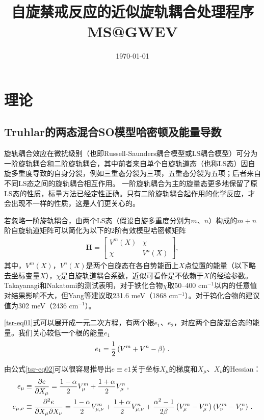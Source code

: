 \documentclass[UTF8]{ctexart}
\title{\heiti 自旋禁戒反应的近似旋轨耦合处理程序MS@GWEV}
\date{\today}
\begin{document}
\maketitle

\vspace{10mm}
\tableofcontents

\newpage

\section{理论}

\subsection{Truhlar的两态混合SO模型哈密顿及能量导数}

旋轨耦合效应在微扰级别（也即Russell-Saunders耦合模型或LS耦合模型\cite{ref1}）可分为一阶旋轨耦合和二阶旋轨耦合，其中前者来自单个自旋轨道态（也称LS态）因自旋多重度导致的自身分裂，例如三重态分裂为三项，五重态分裂为五项；后者来自不同LS态之间的旋轨耦合相互作用。
一阶旋轨耦合为主的旋量态更多地保留了原LS态的性质，标量方法已经定性正确。只有二阶旋轨耦合起作用的化学反应，才会出现不一样的性质，这是人们更关心的。

若忽略一阶旋轨耦合，由两个LS态（假设自旋多重度分别为$m$、$n$）构成的$m+n$阶自旋轨道矩阵可以简化为以下的2阶有效模型哈密顿矩阵\cite{ref2,ref3}
\begin{align}\label{tsr-eq01}
\mathbf{H} =
\left[\begin{array}{cc}
    V^m(X) &  \chi \\
    \chi & V^n(X)
\end{array}\right],
\end{align}
其中，$V^m(X)$，$V^n(X)$是两个自旋态在各自势能面上$X$点位置的能量（以下略去坐标变量$X$），$\chi$是自旋轨道耦合系数，近似可看作是不依赖于$X$的经验参数。Takayanagi和Nakatomi的测试表明，对于铁化合物$\chi$取50--400 cm$^{-1}$以内的任意值对结果影响不大\cite{ref2}，但Yang等建议取231.6 meV（1868 cm$^{-1}$）。对于钨化合物的建议值为302 meV（2436 cm$^{-1}$）\cite{ref3}。

\eqref{tsr-eq01}式可以展开成一元二次方程，有两个根$e_1$、$e_2$，对应两个自旋混合态的能量。我们关心较低一个根的能量$e_1$
\begin{align}\label{tsr-eq02}
e_1 = \frac{1}{2}\left(V^m + V^n - \beta\right)  \, \rm .
\end{align}

由公式\eqref{tsr-eq02}可以很容易推导出$e \equiv e1$关于坐标$X_\mu$的梯度和$X_\mu$、$X_\nu$的Hessian\cite{ref2,ref3}：
\begin{align}\label{tsr-eq03}
e_\mu & \equiv \frac{\partial e}{\partial X_\mu} = \frac{1-\alpha}{2}V^m_\mu + \frac{1+\alpha}{2}V^n_\mu  \, \rm , \\ \label{tsr-eq04}
e_{\mu,\nu} & \equiv \frac{\partial^2 e}{\partial X_\mu\partial X_\nu} = \frac{1-\alpha}{2}V^m_{\mu,\nu} + \frac{1+\alpha}{2}V^n_{\mu,\nu} + \frac{\alpha^2-1}{2\beta}\left(V^m_\mu-V^n_\mu\right)\left(V^m_\nu-V^n_\nu\right)  \, \rm .
\end{align}
\end{document}
